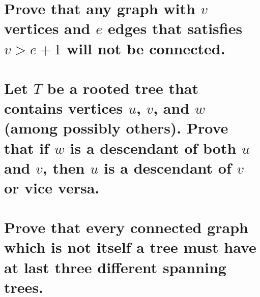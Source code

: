 \documentclass{article}
\begin{document}

\section{Prove that any graph with $v$ vertices and $e$ edges that satisfies $v>e+1$ will not be connected.}


\section{Let $T$ be a rooted tree that contains vertices $u$, $v$, and $w$ (among possibly others). Prove that if $w$ is a descendant of both $u$ and $v$, then $u$ is a descendant of $v$ or vice versa.}


\section{Prove that every connected graph which is not itself a tree must have at last three different spanning trees.}
\end{document}
